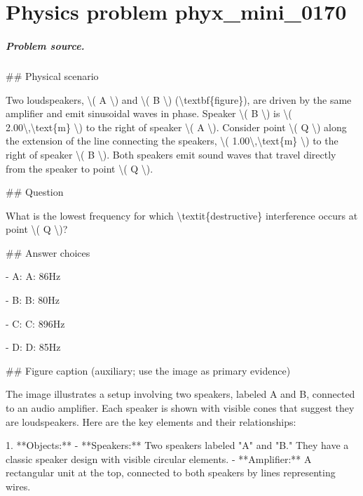 
\chapter{Physics problem phyx\_mini\_0170}
\label{ch:PhyXMiniProblems_problem_phyx_mini_0170}

\paragraph{Problem source.}
\#\# Physical scenario

Two loudspeakers, \textbackslash{}( A \textbackslash{}) and \textbackslash{}( B \textbackslash{}) (\textbackslash{}textbf\{figure\}), are driven by the same amplifier and emit sinusoidal waves in phase. Speaker \textbackslash{}( B \textbackslash{}) is \textbackslash{}( 2.00\textbackslash{},\textbackslash{}text\{m\} \textbackslash{}) to the right of speaker \textbackslash{}( A \textbackslash{}). Consider point \textbackslash{}( Q \textbackslash{}) along the extension of the line connecting the speakers, \textbackslash{}( 1.00\textbackslash{},\textbackslash{}text\{m\} \textbackslash{}) to the right of speaker \textbackslash{}( B \textbackslash{}). Both speakers emit sound waves that travel directly from the speaker to point \textbackslash{}( Q \textbackslash{}).

\#\# Question

What is the lowest frequency for which \textbackslash{}textit\{destructive\} interference occurs at point \textbackslash{}( Q \textbackslash{})?

\#\# Answer choices

- A: A: 86Hz

- B: B: 80Hz

- C: C: 896Hz

- D: D: 85Hz

\#\# Figure caption (auxiliary; use the image as primary evidence)

The image illustrates a setup involving two speakers, labeled A and B, connected to an audio amplifier. Each speaker is shown with visible cones that suggest they are loudspeakers. Here are the key elements and their relationships: 

1. **Objects:**
   - **Speakers:** Two speakers labeled "A" and "B." They have a classic speaker design with visible circular elements.
   - **Amplifier:** A rectangular unit at the top, connected to both speakers by lines representing wires.

